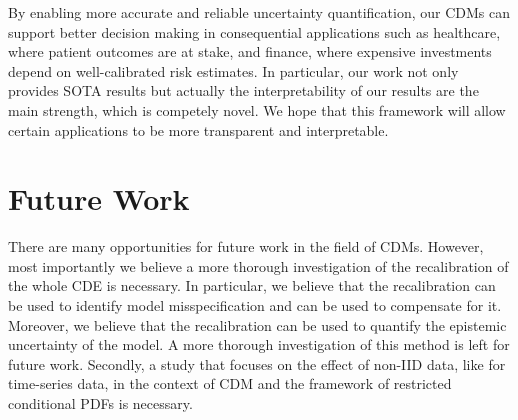 By enabling more accurate and reliable uncertainty quantification, our CDMs can support better decision making in consequential applications such as healthcare, where patient outcomes are at stake, and finance, where expensive investments depend on well-calibrated risk estimates. In particular, our work not only provides SOTA results but actually the interpretability of our results are the main strength, which is competely novel. We hope that this framework will allow certain applications to be more transparent and interpretable.

\section{Future Work}
There are many opportunities for future work in the field of CDMs. However, most importantly we believe a more thorough investigation of the recalibration of the whole CDE is necessary. In particular, we believe that the recalibration can be used to identify model misspecification and can be used to compensate for it. Moreover, we believe that the recalibration can be used to quantify the epistemic uncertainty of the model. A more thorough investigation of this method is left for future work. Secondly, a study that focuses on the effect of non-IID data, like for time-series data, in the context of CDM and the framework of restricted conditional PDFs is necessary.